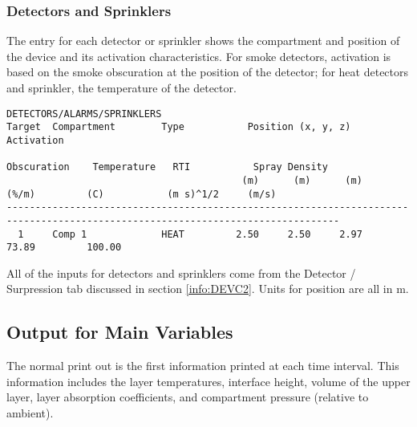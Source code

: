 \subsubsection{Detectors and Sprinklers}

The entry for each detector or sprinkler shows the compartment and position of the device and its activation characteristics. For smoke detectors, activation is based on the smoke obscuration at the position of the detector; for heat detectors and sprinkler, the temperature of the detector.


\begin{lstlisting}[basicstyle=\tiny]
DETECTORS/ALARMS/SPRINKLERS
Target  Compartment        Type           Position (x, y, z)            Activation
                                                                        Obscuration    Temperature   RTI           Spray Density
                                         (m)      (m)      (m)          (%/m)         (C)           (m s)^1/2     (m/s)
--------------------------------------------------------------------------------------------------------------------------------
  1     Comp 1             HEAT         2.50     2.50     2.97                         73.89         100.00
\end{lstlisting}

All of the inputs for detectors and sprinklers come from the Detector / Surpression tab discussed in section \ref{info:DEVC2}. Units for position are all in m.

\subsection{Output for Main Variables}

The normal print out is the first information printed at each time interval.  This information includes the layer temperatures, interface height, volume of the upper layer, layer absorption coefficients, and compartment pressure (relative to ambient).

